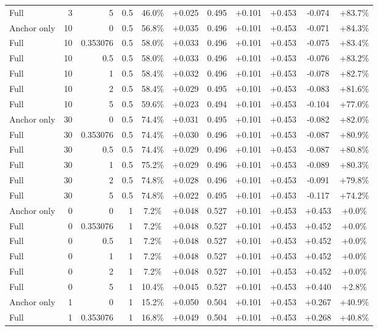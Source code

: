 \begin{table}[htbp]
\begin{tabular}{lrrrccccccc}
Full & 3 & 5 & 0.5 & 46.0\% & +0.025 & 0.495 & +0.101 & +0.453 & -0.074 & +83.7\% \\
Anchor only & 10 & 0 & 0.5 & 56.8\% & +0.035 & 0.496 & +0.101 & +0.453 & -0.071 & +84.3\% \\
Full & 10 & 0.353076 & 0.5 & 58.0\% & +0.033 & 0.496 & +0.101 & +0.453 & -0.075 & +83.4\% \\
Full & 10 & 0.5 & 0.5 & 58.0\% & +0.033 & 0.496 & +0.101 & +0.453 & -0.076 & +83.2\% \\
Full & 10 & 1 & 0.5 & 58.4\% & +0.032 & 0.496 & +0.101 & +0.453 & -0.078 & +82.7\% \\
Full & 10 & 2 & 0.5 & 58.4\% & +0.029 & 0.495 & +0.101 & +0.453 & -0.083 & +81.6\% \\
Full & 10 & 5 & 0.5 & 59.6\% & +0.023 & 0.494 & +0.101 & +0.453 & -0.104 & +77.0\% \\
Anchor only & 30 & 0 & 0.5 & 74.4\% & +0.031 & 0.495 & +0.101 & +0.453 & -0.082 & +82.0\% \\
Full & 30 & 0.353076 & 0.5 & 74.4\% & +0.030 & 0.496 & +0.101 & +0.453 & -0.087 & +80.9\% \\
Full & 30 & 0.5 & 0.5 & 74.4\% & +0.029 & 0.496 & +0.101 & +0.453 & -0.087 & +80.8\% \\
Full & 30 & 1 & 0.5 & 75.2\% & +0.029 & 0.496 & +0.101 & +0.453 & -0.089 & +80.3\% \\
Full & 30 & 2 & 0.5 & 74.8\% & +0.028 & 0.496 & +0.101 & +0.453 & -0.091 & +79.8\% \\
Full & 30 & 5 & 0.5 & 74.8\% & +0.022 & 0.495 & +0.101 & +0.453 & -0.117 & +74.2\% \\
Anchor only & 0 & 0 & 1 & 7.2\% & +0.048 & 0.527 & +0.101 & +0.453 & +0.453 & +0.0\% \\
Full & 0 & 0.353076 & 1 & 7.2\% & +0.048 & 0.527 & +0.101 & +0.453 & +0.452 & +0.0\% \\
Full & 0 & 0.5 & 1 & 7.2\% & +0.048 & 0.527 & +0.101 & +0.453 & +0.452 & +0.0\% \\
Full & 0 & 1 & 1 & 7.2\% & +0.048 & 0.527 & +0.101 & +0.453 & +0.452 & +0.0\% \\
Full & 0 & 2 & 1 & 7.2\% & +0.048 & 0.527 & +0.101 & +0.453 & +0.452 & +0.0\% \\
Full & 0 & 5 & 1 & 10.4\% & +0.045 & 0.527 & +0.101 & +0.453 & +0.440 & +2.8\% \\
Anchor only & 1 & 0 & 1 & 15.2\% & +0.050 & 0.504 & +0.101 & +0.453 & +0.267 & +40.9\% \\
Full & 1 & 0.353076 & 1 & 16.8\% & +0.049 & 0.504 & +0.101 & +0.453 & +0.268 & +40.8\% \\

\end{tabular}
\end{table}
